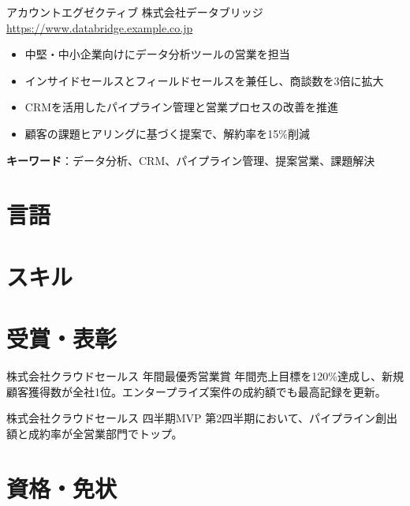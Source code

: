 \documentclass[a4paper, serif, 10pt]{moderncv}
\begin{document}
        {アカウントエグゼクティブ}
        {株式会社データブリッジ}
        {\url{https://www.databridge.example.co.jp}}
        {}
        {\begin{itemize}
\item 中堅・中小企業向けにデータ分析ツールの営業を担当
\item インサイドセールスとフィールドセールスを兼任し、商談数を3倍に拡大
\item CRMを活用したパイプライン管理と営業プロセスの改善を推進
\item 顧客の課題ヒアリングに基づく提案で、解約率を15\%削減
\end{itemize}
\textbf{キーワード}：データ分析、CRM、パイプライン管理、提案営業、課題解決}
\section{言語}

\section{スキル}

\section{受賞・表彰}

        {株式会社クラウドセールス}
        {年間最優秀営業賞}
        {}
        {}
        {年間売上目標を120\%達成し、新規顧客獲得数が全社1位。エンタープライズ案件の成約額でも最高記録を更新。}

        {株式会社クラウドセールス}
        {四半期MVP}
        {}
        {}
        {第2四半期において、パイプライン創出額と成約率が全営業部門でトップ。}
\section{資格・免状}
\end{document}
